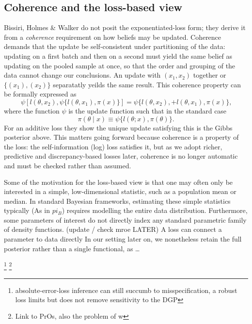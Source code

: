 \documentclass[11pt,a4paper]{article}
\newcommand{\add}[1]{{\color{red}#1}}
\begin{document}
\subsection*{\add{Coherence and the loss-based view}}
Bissiri, Holmes \& Walker do not posit the exponentiated-loss form; they derive it from a \emph{coherence} requirement on how beliefs may be updated. Coherence demands that the update be self-consistent under partitioning of the data: updating on a first batch and then on a second must yield the same belief as updating on the pooled sample at once, so that the order and grouping of the data cannot change our conclusions. An update with $(x_1, x_2)$ together or $\{(x_1), (x_2)\}$ separatatly yeilds the same result. This coherence property can be formally expressed as $$\psi[l(\theta, x_2), \psi\{l(\theta, x_1),\pi(x)\}]=\psi\{l(\theta, x_2), + l(\theta, x_1),\pi(x)\}\text{,}$$ where the function $\psi$ is the update function such that in the standard case
\[
    \pi(\theta \mid x) \equiv \psi \{l(\theta; x), \pi(\theta)\}.
\]
For an additive loss they show the unique update satisfying this is the Gibbs posterior above. This matters going forward because coherence is a property of the loss: the self-information (log) loss satisfies it, but as we adopt richer, predictive and discrepancy-based losses later, coherence is no longer automatic and must be checked rather than assumed.

Some of the motivation for the loss-based view is that one may often only be interested in a simple, low-dimensional statistic, such as a population mean or median. In standard Bayesian frameworks, estimating these simple statistics typically (As in $pi_B$) requires modelling the entire data distribution. Furthermore, some parameters of interest do not directly index any standard parametric family of density functions. (update / check mroe LATER) \add{A loss can connect a parameter to data directly}
\add{In our setting later on, we nonetheless retain the full posterior rather than a single functional, as \dots}

\footnote{absolute-error-loss inference can still succumb to misspecification, a robust loss limits but does not remove sensitivity to the DGP}
\footnote{Link to PrOs, also the problem of w}
\end{document}
